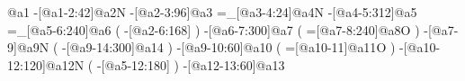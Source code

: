                     @{a1}%
       -[@{a1-2}:42]@{a2}N%
       -[@{a2-3}:96]@{a3}%
      =_[@{a3-4}:24]@{a4}N%
      -[@{a4-5}:312]@{a5}%
     =_[@{a5-6}:240]@{a6}%
                       (
          -[@{a2-6}:168]\phantom{N}%
                       )
      -[@{a6-7}:300]@{a7}%
                       (
          =[@{a7-8}:240]@{a8}O%
                       )
          -[@{a7-9}]@{a9}N%
                       (
         -[@{a9-14}:300]@{a14}%
                       )
      -[@{a9-10}:60]@{a10}%
                       (
            =[@{a10-11}]@{a11}O%
                       )
    -[@{a10-12}:120]@{a12}N%
                       (
         -[@{a5-12}:180]%
                       )
     -[@{a12-13}:60]@{a13}%